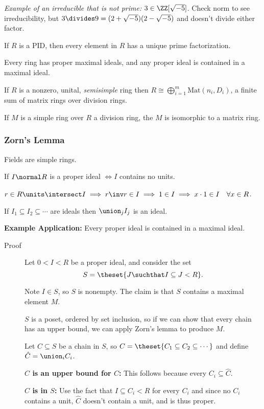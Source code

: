 \emph{Example of an irreducible that is not prime:}
\(3\in \ZZ[\sqrt{-5}]\). Check norm to see irreducibility, but
\(3 \divides 9 = (2+\sqrt{-5})(2-\sqrt{-5})\) and doesn't divide either
factor.

\begin{description}
\tightlist
\item[Lemma]
If \(R\) is a PID, then every element in \(R\) has a unique prime
factorization.
\item[Theorem (Krull)]
Every ring has proper maximal ideals, and any proper ideal is contained
in a maximal ideal.
\item[Theorem (Artin-Wedderubrn)]
If \(R\) is a nonzero, unital, \emph{semisimple} ring then
\(R \cong \bigoplus_{i=1}^m \mathrm{Mat}(n_i, D_i)\), a finite sum of
matrix rings over division rings.
\item[Corollary]
If \(M\) is a simple ring over \(R\) a division ring, the \(M\) is
isomorphic to a matrix ring.
\end{description}

\hypertarget{zorns-lemma}{%
\subsubsection{Zorn's Lemma}\label{zorns-lemma}}

\begin{description}
\tightlist
\item[Lemma]
Fields are simple rings.
\item[Lemma]
If \(I\normal R\) is a proper ideal \(\iff I\) contains no units.
\item[Proof]
\(r\in R\units \intersect I \implies r\inv r \in I \implies 1\in I \implies x\cdot 1 \in I \quad \forall x\in R\).
\item[Lemma]
If \(I_1 \subseteq I_2 \subseteq \cdots\) are ideals then
\(\union_j I_j\) is an ideal.
\end{description}

\textbf{Example Application:} Every proper ideal is contained in a
maximal ideal.

\begin{description}
\item[Proof]
Let \(0 < I < R\) be a proper ideal, and consider the set \[
S = \theset{J \suchthat I   \subseteq J < R}
.\]

Note \(I\in S\), so \(S\) is nonempty. The claim is that \(S\) contains
a maximal element \(M\).

\(S\) is a poset, ordered by set inclusion, so if we can show that every
chain has an upper bound, we can apply Zorn's lemma to produce \(M\).

Let \(C \subseteq S\) be a chain in \(S\), so
\(C = \theset{C_1 \subseteq C_2 \subseteq \cdots}\) and define
\(\hat C = \union_i C_i\).

\textbf{\(\hat C\) is an upper bound for \(C\):} This follows because
every \(C_i \subseteq \hat C\).

\textbf{\(\hat C\) is in \(S\):} Use the fact that
\(I \subseteq C_i < R\) for every \(C_i\) and since no \(C_i\) contains
a unit, \(\hat C\) doesn't contain a unit, and is thus proper.
\end{description}

